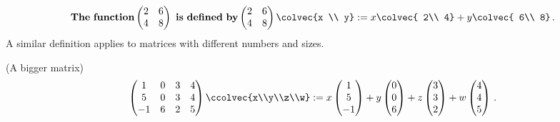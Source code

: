 \begin{equation*}
 {\rm {\bf The~function}}   \begin{pmatrix}
      2     & 6 \\
      4     & 8
    \end{pmatrix}~{\rm {\bf is~defined~by}}
    \begin{pmatrix}
      2     & 6 \\
      4     & 8
    \end{pmatrix}
  \colvec{x \\ y}
  := x \colvec{ 2\\ 4} + y \colvec{ 6\\ 8} \, .
\end{equation*}
A similar definition applies to matrices with different numbers and sizes.

\begin{example}(A bigger matrix)
\[
\begin{pmatrix}1&0&3&4\\
5&0&3&4\\
-1&6&2&5
\end{pmatrix}
\ccolvec{x\\y\\z\\w}
:=x
\begin{pmatrix}1\\5\\-1
\end{pmatrix}
+y
\begin{pmatrix}0\\0\\6
\end{pmatrix}
+z
\begin{pmatrix}3\\3\\2
\end{pmatrix}
+w\begin{pmatrix}4\\4\\5
\end{pmatrix}\, .
\]
\end{example}


